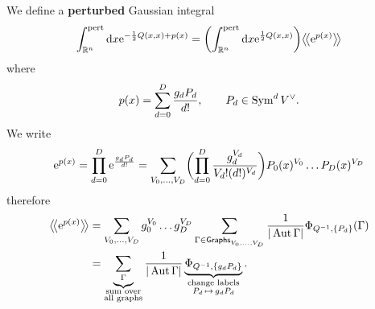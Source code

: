 We define a \textbf{perturbed} Gaussian integral
\begin{equation*}
  \int_{\mathbb{R}^n}^\text{pert} \mathrm{d} x \mathrm{e}^{-\frac{1}{2} Q(x, x) + p(x)}
  = \biggl( \int_{\mathbb{R}^n}^\text{pert} \mathrm{d} x \mathrm{e}^{\frac{1}{2} Q(x, x)} \biggr) \big \langle \! \big \langle {\mathrm{e}^{p(x)}} \big \rangle \! \big \rangle
\end{equation*}
where
\begin{equation*}
  p(x) = \sum_{d = 0}^D \frac{g_d P_d}{d!}, \qquad P_d \in \operatorname{Sym}^d V^\vee.
\end{equation*}
We write
\begin{equation*}
  \mathrm{e}^{p(x)} 
  = \prod_{d = 0}^D \mathrm{e}^{\frac{g_d P_d}{d!}}
  = \sum_{V_0, \dots, V_D} \biggl( \prod_{d = 0}^D \frac{g_d^{V_d}}{V_d! (d!)^{V_d}} \biggr)
  P_0(x)^{V_0} \dots P_D(x)^{V_D}
\end{equation*}
therefore
\begin{align*}
  \big \langle \! \big \langle {\mathrm{e}^{p(x)}} \big \rangle \! \big \rangle
  &= \sum_{V_0, \dots, V_D} g_0^{V_0} \dots g_D^{V_D}
  \sum_{\Gamma \in \mathsf{Graphs}_{V_0, \dots, V_D}}
  \frac{1}{|\operatorname{Aut} \Gamma|} \Phi_{Q^{-1}, \{P_d\}} (\Gamma) \\
  &= \underbrace{\sum_{\Gamma}}_{\substack{\text{sum over} \\ \text{all graphs}}} \frac{1}{|\operatorname{Aut} \Gamma|}
  \underbrace{\Phi_{Q^{-1}, \{g_d P_d\}}}_{\substack{\text{change labels} \\ P_d \, \mapsto \, g_d P_d}}.
\end{align*}

